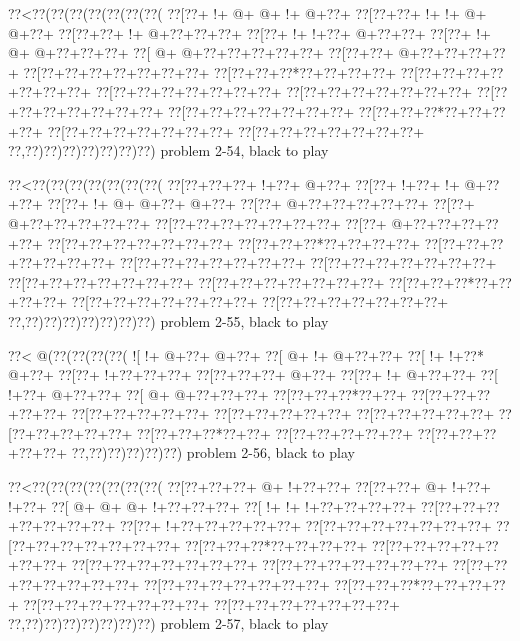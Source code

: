 \vbox{\vbox{\goo
\0??<\0??(\0??(\0??(\0??(\0??(\0??(\0??(
\0??[\0??+\- !+\- @+\- @+\- !+\- @+\0??+
\0??[\0??+\0??+\- !+\- !+\- @+\- @+\0??+
\0??[\0??+\0??+\- !+\- @+\0??+\0??+\0??+
\0??[\0??+\- !+\- !+\0??+\- @+\0??+\0??+
\0??[\0??+\- !+\- @+\- @+\0??+\0??+\0??+
\0??[\- @+\- @+\0??+\0??+\0??+\0??+\0??+
\0??[\0??+\0??+\- @+\0??+\0??+\0??+\0??+
\0??[\0??+\0??+\0??+\0??+\0??+\0??+\0??+
\0??[\0??+\0??+\0??*\0??+\0??+\0??+\0??+
\0??[\0??+\0??+\0??+\0??+\0??+\0??+\0??+
\0??[\0??+\0??+\0??+\0??+\0??+\0??+\0??+
\0??[\0??+\0??+\0??+\0??+\0??+\0??+\0??+
\0??[\0??+\0??+\0??+\0??+\0??+\0??+\0??+
\0??[\0??+\0??+\0??+\0??+\0??+\0??+\0??+
\0??[\0??+\0??+\0??*\0??+\0??+\0??+\0??+
\0??[\0??+\0??+\0??+\0??+\0??+\0??+\0??+
\0??[\0??+\0??+\0??+\0??+\0??+\0??+\0??+
\0??,\0??)\0??)\0??)\0??)\0??)\0??)\0??)
}
\hfil problem 2-54, black to play\hfil\break
}

\vbox{\vbox{\goo
\0??<\0??(\0??(\0??(\0??(\0??(\0??(\0??(
\0??[\0??+\0??+\0??+\- !+\0??+\- @+\0??+
\0??[\0??+\- !+\0??+\- !+\- @+\0??+\0??+
\0??[\0??+\- !+\- @+\- @+\0??+\- @+\0??+
\0??[\0??+\- @+\0??+\0??+\0??+\0??+\0??+
\0??[\0??+\- @+\0??+\0??+\0??+\0??+\0??+
\0??[\0??+\0??+\0??+\0??+\0??+\0??+\0??+
\0??[\0??+\- @+\0??+\0??+\0??+\0??+\0??+
\0??[\0??+\0??+\0??+\0??+\0??+\0??+\0??+
\0??[\0??+\0??+\0??*\0??+\0??+\0??+\0??+
\0??[\0??+\0??+\0??+\0??+\0??+\0??+\0??+
\0??[\0??+\0??+\0??+\0??+\0??+\0??+\0??+
\0??[\0??+\0??+\0??+\0??+\0??+\0??+\0??+
\0??[\0??+\0??+\0??+\0??+\0??+\0??+\0??+
\0??[\0??+\0??+\0??+\0??+\0??+\0??+\0??+
\0??[\0??+\0??+\0??*\0??+\0??+\0??+\0??+
\0??[\0??+\0??+\0??+\0??+\0??+\0??+\0??+
\0??[\0??+\0??+\0??+\0??+\0??+\0??+\0??+
\0??,\0??)\0??)\0??)\0??)\0??)\0??)\0??)
}
\hfil problem 2-55, black to play\hfil\break
}

\vbox{\vbox{\goo
\0??<\- @(\0??(\0??(\0??(\0??(
\- ![\- !+\- @+\0??+\- @+\0??+
\0??[\- @+\- !+\- @+\0??+\0??+
\0??[\- !+\- !+\0??*\- @+\0??+
\0??[\0??+\- !+\0??+\0??+\0??+
\0??[\0??+\0??+\0??+\- @+\0??+
\0??[\0??+\- !+\- @+\0??+\0??+
\0??[\- !+\0??+\- @+\0??+\0??+
\0??[\- @+\- @+\0??+\0??+\0??+
\0??[\0??+\0??+\0??*\0??+\0??+
\0??[\0??+\0??+\0??+\0??+\0??+
\0??[\0??+\0??+\0??+\0??+\0??+
\0??[\0??+\0??+\0??+\0??+\0??+
\0??[\0??+\0??+\0??+\0??+\0??+
\0??[\0??+\0??+\0??+\0??+\0??+
\0??[\0??+\0??+\0??*\0??+\0??+
\0??[\0??+\0??+\0??+\0??+\0??+
\0??[\0??+\0??+\0??+\0??+\0??+
\0??,\0??)\0??)\0??)\0??)\0??)
}
\hfil problem 2-56, black to play\hfil\break
}

\vbox{\vbox{\goo
\0??<\0??(\0??(\0??(\0??(\0??(\0??(\0??(
\0??[\0??+\0??+\0??+\- @+\- !+\0??+\0??+
\0??[\0??+\0??+\- @+\- !+\0??+\- !+\0??+
\0??[\- @+\- @+\- @+\- !+\0??+\0??+\0??+
\0??[\- !+\- !+\- !+\0??+\0??+\0??+\0??+
\0??[\0??+\0??+\0??+\0??+\0??+\0??+\0??+
\0??[\0??+\- !+\0??+\0??+\0??+\0??+\0??+
\0??[\0??+\0??+\0??+\0??+\0??+\0??+\0??+
\0??[\0??+\0??+\0??+\0??+\0??+\0??+\0??+
\0??[\0??+\0??+\0??*\0??+\0??+\0??+\0??+
\0??[\0??+\0??+\0??+\0??+\0??+\0??+\0??+
\0??[\0??+\0??+\0??+\0??+\0??+\0??+\0??+
\0??[\0??+\0??+\0??+\0??+\0??+\0??+\0??+
\0??[\0??+\0??+\0??+\0??+\0??+\0??+\0??+
\0??[\0??+\0??+\0??+\0??+\0??+\0??+\0??+
\0??[\0??+\0??+\0??*\0??+\0??+\0??+\0??+
\0??[\0??+\0??+\0??+\0??+\0??+\0??+\0??+
\0??[\0??+\0??+\0??+\0??+\0??+\0??+\0??+
\0??,\0??)\0??)\0??)\0??)\0??)\0??)\0??)
}
\hfil problem 2-57, black to play\hfil\break
}


